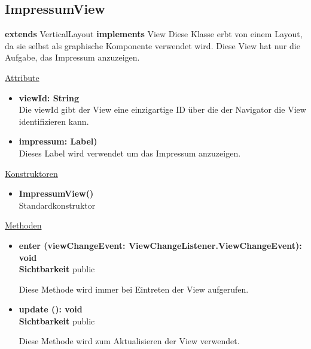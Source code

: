 \newpage
\subsection{ImpressumView}\label{ImpressumView}
\textbf{extends}  VerticalLayout \newline
\textbf{implements} View \newline
Diese Klasse erbt von einem Layout, da sie selbst als graphische Komponente verwendet wird. Diese View hat nur die Aufgabe, das Impressum anzuzeigen.

\underline{Attribute}
\begin{itemize}
\itemsep0pt
\item \textbf{viewId: String} \hfill\\ 
Die viewId gibt der View eine einzigartige ID über die der Navigator die View identifizieren kann.

\item \textbf{impressum: Label)} \hfill\\ 
Dieses Label wird verwendet um das Impressum anzuzeigen.

\end{itemize}

\underline{Konstruktoren}
\begin{itemize}
\itemsep0pt
\item \textbf{ImpressumView()} \hfill\\
Standardkonstruktor
\end{itemize}

\underline{Methoden}
\begin{itemize}
\itemsep0pt
\item \textbf{enter (viewChangeEvent: ViewChangeListener.ViewChangeEvent): void}\hfill\\
\textbf{Sichtbarkeit} public

Diese Methode wird immer bei Eintreten der View aufgerufen.

\item \textbf{update (): void}\hfill\\
\textbf{Sichtbarkeit} public

Diese Methode wird zum Aktualisieren der View verwendet.

\end{itemize}
